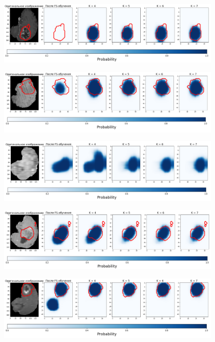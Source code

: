 \begin{figure}[h!] 
  \center
  \includegraphics [scale=0.7] {images/good_7.png}
\end{figure}

\begin{figure}[h!] 
  \center
  \includegraphics [scale=0.7] {images/good_8.png}
\end{figure}

\begin{figure}[h!] 
  \center
  \includegraphics [scale=0.7] {images/good_9.png}
\end{figure}


\begin{figure}[h!] 
  \center
  \includegraphics [scale=0.7] {images/good_10.png}
\end{figure}

\begin{figure}[h!] 
  \center
  \includegraphics [scale=0.7] {images/good_11.png}
\end{figure}


